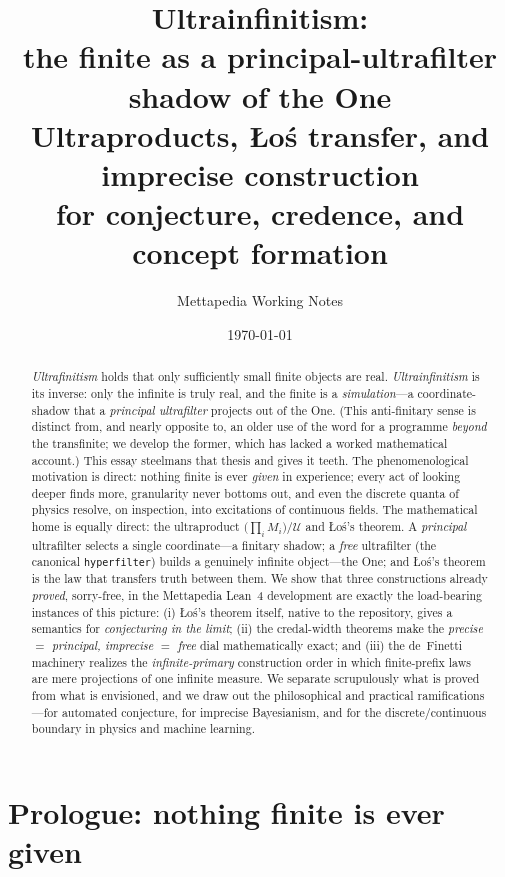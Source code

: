 \documentclass[]{article}
\title{Ultrainfinitism:\\
       the finite as a principal-ultrafilter shadow of the One\\[4pt]
       {\large Ultraproducts, \L o\'s transfer, and imprecise construction\\
        for conjecture, credence, and concept formation}}
\author{Mettapedia Working Notes}
\date{\today}
\theoremstyle{definition}
\theoremstyle{remark}
\newcommand{\code}[1]{\texttt{#1}}
\newcommand{\Uf}{\mathcal{U}}
\DeclareMathOperator{\uprod}{\textstyle\prod}
\begin{document}
\maketitle

\begin{abstract}
\emph{Ultrafinitism} holds that only sufficiently small finite objects are real.
\emph{Ultrainfinitism} is its inverse: only the infinite is truly real, and the
finite is a \emph{simulation}---a coordinate-shadow that a \emph{principal
ultrafilter} projects out of the One. (This anti-finitary sense is distinct from,
and nearly opposite to, an older use of the word for a programme \emph{beyond} the
transfinite; we develop the former, which has lacked a worked mathematical account.)
This essay steelmans that thesis and gives it teeth. The phenomenological motivation is direct: nothing finite is ever
\emph{given} in experience; every act of looking deeper finds more, granularity
never bottoms out, and even the discrete quanta of physics resolve, on inspection,
into excitations of continuous fields. The mathematical home is equally direct:
the ultraproduct $\bigl(\uprod_i M_i\bigr)/\Uf$ and {\L}o\'s's theorem. A
\emph{principal} ultrafilter selects a single coordinate---a finitary shadow; a
\emph{free} ultrafilter (the canonical \code{hyperfilter}) builds a genuinely
infinite object---the One; and {\L}o\'s's theorem is the law that transfers truth
between them. We show that three constructions already \emph{proved}, sorry-free,
in the Mettapedia Lean~4 development are exactly the load-bearing instances of this
picture: (i) {\L}o\'s's theorem itself, native to the repository, gives a semantics
for \emph{conjecturing in the limit}; (ii) the credal-width theorems make the
\emph{precise $=$ principal, imprecise $=$ free} dial mathematically exact; and
(iii) the de~Finetti machinery realizes the \emph{infinite-primary} construction
order in which finite-prefix laws are mere projections of one infinite measure.
We separate scrupulously what is proved from what is envisioned, and we draw out
the philosophical and practical ramifications---for automated conjecture, for
imprecise Bayesianism, and for the discrete/continuous boundary in physics and
machine learning.
\end{abstract}

\section{Prologue: nothing finite is ever given}
\label{sec:prologue}
\end{document}
